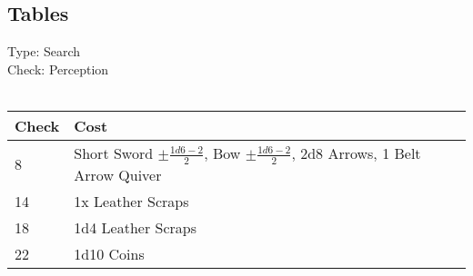 \subsection{Tables}
Type: Search\\
Check: Perception\\
\\
\begin{minipage}{0.8\textwidth}
	\begin{tabular}{|l | p{11cm}|}
		\hline
		Check & Cost\\
		\hline
		8 & Short Sword $\pm \frac{1d6 - 2}{2}$, Bow $\pm \frac{1d6 - 2}{2}$, 2d8 Arrows, 1 Belt Arrow Quiver\\
		14 & 1x Leather Scraps\\
		18 & 1d4 Leather Scraps\\
		22 & 1d10 Coins\\
		\hline
	\end{tabular}
\end{minipage}
\pagebreak